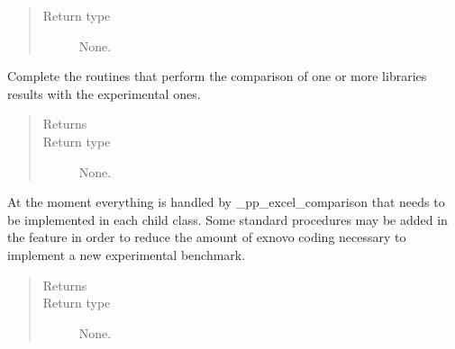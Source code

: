 \documentclass[letterpaper,10pt,english]{sphinxmanual}
\begin{document}
\begin{fulllineitems}
\begin{fulllineitems}
\begin{quote}
\begin{description}
\item[{Return type}] \leavevmode
\sphinxAtStartPar
None.

\end{description}\end{quote}

\end{fulllineitems}


\begin{fulllineitems}
\label{\detokenize{api/postprocessing:expoutput.ExperimentalOutput.compare}}
\sphinxAtStartPar
Complete the routines that perform the comparison of one or more
libraries results with the experimental ones.
\begin{quote}\begin{description}
\item[{Returns}] \leavevmode
\sphinxAtStartPar


\item[{Return type}] \leavevmode
\sphinxAtStartPar
None.

\end{description}\end{quote}

\end{fulllineitems}


\begin{fulllineitems}
\label{\detokenize{api/postprocessing:expoutput.ExperimentalOutput.pp_excel_comparison}}
\sphinxAtStartPar
At the moment everything is handled by \_pp\_excel\_comparison that needs
to be implemented in each child class. Some standard procedures may be
added in the feature in order to reduce the amount of ex\sphinxhyphen{}novo coding
necessary to implement a new experimental benchmark.
\begin{quote}\begin{description}
\item[{Returns}] \leavevmode
\sphinxAtStartPar


\item[{Return type}] \leavevmode
\sphinxAtStartPar
None.


\end{description}
\end{quote}
\end{fulllineitems}
\end{fulllineitems}
\end{document}
